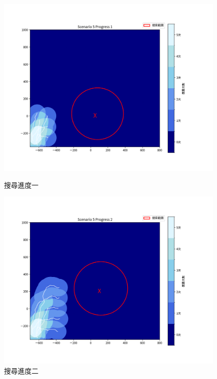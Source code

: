 \documentclass[12pt,a4paper]{article}
\begin{document}
\begin{figure}[h]
    \centering
    \begin{minipage}[t]{0.45\textwidth}
        \centering
        \includegraphics[width=\textwidth]{image/Single1.png}
        \caption{搜尋進度一}
    \end{minipage}
    \hfill
    \begin{minipage}[t]{0.45\textwidth}
        \centering
        \includegraphics[width=\textwidth]{image/Single2.png}
        \caption{搜尋進度二}
    \end{minipage}


\end{figure}
\end{document}
